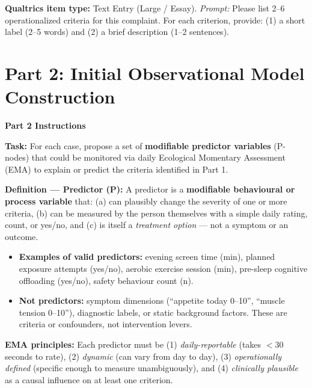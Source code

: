 \documentclass[11pt,a4paper]{article}
\newcommand{\responsetextarea}[1]{\begin{tcolorbox}[colback=ResponseBG,colframe=GoldAmber,boxrule=0.6pt,arc=1.5mm,left=6pt,right=6pt,top=5pt,bottom=5pt]\small\textbf{\color{GoldAmber}Qualtrics item type:} Text Entry (Large / Essay). \quad \textit{Prompt:} #1\end{tcolorbox}}
\begin{document}
\responsetextarea{Please list 2--6 operationalized criteria for this complaint. For each criterion, provide: (1) a short label (2--5 words) and (2) a brief description (1--2 sentences).}

\newpage

\section{Part 2: Initial Observational Model Construction}

\begin{tcolorbox}[colback=PartTwoBG,colframe=ForestGreen,arc=2.5mm,boxrule=0.9pt,left=10pt,right=10pt,top=9pt,bottom=9pt]
\textbf{\color{ForestGreen}Part 2 Instructions}

\smallskip
\textbf{Task:} For each case, propose a set of \textbf{modifiable predictor variables} (P-nodes) that could be monitored via daily Ecological Momentary Assessment (EMA) to explain or predict the criteria identified in Part 1.

\textbf{Definition --- Predictor (P):} A predictor is a \textbf{modifiable behavioural or process variable} that: (a) can plausibly change the severity of one or more criteria, (b) can be measured by the person themselves with a simple daily rating, count, or yes/no, and (c) is itself a \emph{treatment option} --- not a symptom or an outcome.

\begin{itemize}[topsep=3pt,itemsep=2pt]
\item \textbf{Examples of valid predictors:} evening screen time (min), planned exposure attempts (yes/no), aerobic exercise session (min), pre-sleep cognitive offloading (yes/no), safety behaviour count (n).
\item \textbf{Not predictors:} symptom dimensions (``appetite today 0--10'', ``muscle tension 0--10''), diagnostic labels, or static background factors. These are criteria or confounders, not intervention levers.
\end{itemize}

\textbf{EMA principles:} Each predictor must be (1) \emph{daily-reportable} (takes $<$30 seconds to rate), (2) \emph{dynamic} (can vary from day to day), (3) \emph{operationally defined} (specific enough to measure unambiguously), and (4) \emph{clinically plausible} as a causal influence on at least one criterion.


\end{tcolorbox}
\end{document}
